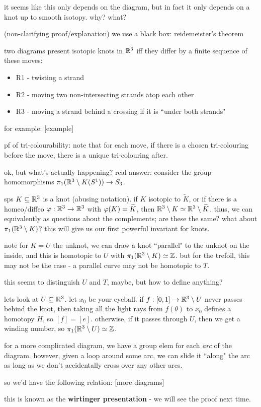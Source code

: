 it seems like this only depends on the diagram, but in fact it only depends on
a knot up to smooth isotopy. why? what?

(non-clarifying proof/explanation) we use a black box: reidemeister's theorem

two diagrams present isotopic knots in $\mathbb{R}^{3}$ iff they differ by a finite
sequence of these moves:
\begin{itemize}
    \item R1 - twisting a strand
    \item R2 - moving two non-intersecting strands atop each other
    \item R3 - moving a strand behind a crossing if it is
        ``under both strands"
\end{itemize}
for example: [example]

pf of tri-colourability:
note that for each move, if there is a chosen tri-colouring before the move,
there is a unique tri-colouring after.

ok, but what's actually happening?
real answer: consider the group homomorphisms
$\pi_{1}(\mathbb{R}^{3}\setminus K(S^{1}))\rightarrow S_{3}$.

sps $K\subseteq\mathbb{R}^{3}$ is a knot (abusing notation).
if $K$ isotopic to $\tilde{K}$, or if there is a  homeo/diffeo
$\varphi:\mathbb{R}^{3}\rightarrow\mathbb{R}^{3}$ with $\varphi(K)=\widetilde{K}$, then
$\mathbb{R}^{3}\setminus K\simeq\mathbb{R}^{3}\setminus\widetilde{K}$.
thus, we can equivalently as questions about the complements; are these the same?
what about $\pi_{1}(\mathbb{R}^{3}\setminus K)$?
this will give us our first powerful invariant for knots.

note for $K=U$ the unknot, we can draw a knot ``parallel" to the unknot on the
inside, and this is homotopic to $U$ with $\pi_{1}(\mathbb{R}^{3}\setminus K)\simeq\mathbb{Z}$.
but for the trefoil, this may not be the case - a parallel curve may not be
homotopic to $T$.

this seems to distinguish $U$ and $T$, maybe, but how to define anything?

lets look at $U\subseteq\mathbb{R}^{3}$. let $x_{0}$ be your eyeball.
if $f:[0,1]\rightarrow\mathbb{R}^{3}\setminus U$ never passes behind the knot, then taking all the
light rays from $f(\theta)$ to $x_{0}$ defines a homotopy $H$, so $[f]=[e]$.
otherwise, if it passes through $U$, then we get a winding number, so
$\pi_{1}(\mathbb{R}^{3}\setminus U)\simeq\mathbb{Z}$.

for a more complicated diagram, we have a group elem for each \textit{arc} of the
diagram. however, given a loop around some arc, we can slide it ``along" the arc
as long as we don't accidentally cross over any other arcs.

so we'd have the following relation:
[more diagrams]

this is known as the \textbf{wirtinger presentation} - we will see the proof
next time.

